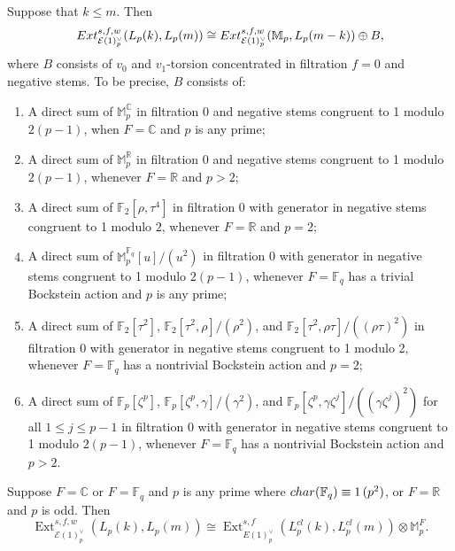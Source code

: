 \documentclass[10pt,a4paper]{amsart}
\DeclareMathOperator{\Ext}{Ext}
\newcommand{\cE}{{\mathcal E}}
\newcommand{\mC}{{\mathbb C}}
\newcommand{\mF}{{\mathbb F}}
\newcommand{\mM}{{\mathbb M}}
\newcommand{\mR}{{\mathbb R}}
\begin{document}
\begin{proposition}
\label{prop:ExtLightningflashKleqM}
    Suppose that $k \leq m$. Then 
    \[\textup{Ext}^{s,f,w}_{\mathcal{E}(1)^\vee_p}(L_p(k), L_p(m)) \cong \textup{Ext}_{\mathcal{E}(1)^\vee_p}^{s,f,w}(\mathbb{M}_p, L_p(m-k)) \oplus B,\]
    where $B$ consists of $v_0$ and $v_1$-torsion concentrated in filtration $f=0$ and negative stems.
    To be precise, $B$ consists of:
    \begin{enumerate}
        \item A direct sum of $\mathbb{M}_p^{\mathbb{C}}$ in filtration 0 and negative stems congruent to 1 modulo $2(p-1)$, when $F=\mathbb{C}$ and $p$ is any prime;
        \item A direct sum of $\mathbb{M}_p^\mathbb{R}$ in filtration 0 and negative stems congruent to 1 modulo $2(p-1)$, whenever $F=\mathbb{R}$ and $p>2$;
        \item A direct sum of $\mathbb{F}_2[\rho, \tau^4]$ in filtration 0 with generator in negative stems congruent to 1 modulo $2$, whenever $F=\mathbb{R}$ and $p=2$;
        \item A direct sum of $\mathbb{M}_p^{\mathbb{F}_q}[u]/(u^2)$ in filtration 0 with generator in negative stems congruent to 1 modulo $2(p-1)$, whenever $F=\mathbb{F}_q$ has a trivial Bockstein action and $p$ is any prime;
        \item A direct sum of $\mathbb{F}_2[\tau^2]$,  $\mathbb{F}_2[\tau^2, \rho]/(\rho^2)$, and $\mathbb{F}_2[\tau^2, \rho\tau]/((\rho\tau)^2)$ in filtration 0 with generator in negative stems congruent to 1 modulo 2, whenever $F=\mathbb{F}_q$ has a nontrivial Bockstein action and $p=2$;
        \item A direct sum of $\mathbb{F}_p[\zeta^p]$, $\mathbb{F}_p[\zeta^p, \gamma]/(\gamma^2)$, and $\mathbb{F}_p[\zeta^p, \gamma\zeta^j]/((\gamma\zeta^j)^2)$ for all $1 \leq j \leq p-1$ in filtration 0 with generator in negative stems congruent to 1 modulo $2(p-1)$, whenever $F=\mathbb{F}_q$ has a nontrivial Bockstein action and $p>2$.
    \end{enumerate}
\end{proposition}

\begin{proposition}\label{prop:lightningExtCase1}
    Suppose $F = \mC$ or $F = \mF_q$ and $p$ is any prime where $\textup{char}(\mathbb{F}_q) \equiv 1 \,(p^2)$, or $F = \mR$ and $p$ is odd. Then \[\Ext_{\cE(1)_p^\vee}^{s,f,w}(L_p(k), L_p(m)) \cong \Ext_{E(1)_p^\vee}^{s,f}(L^{cl}_p(k), L^{cl}_p(m)) \otimes \mM_{p}^{F} .\]
\end{proposition}
\end{document}
